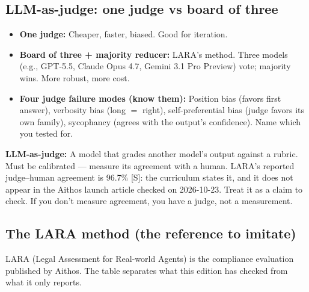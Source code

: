 \subsection{LLM-as-judge: one judge vs board of three}
\begin{itemize}
\item \textbf{One judge:} Cheaper, faster, biased. Good for iteration.
\item \textbf{Board of three + majority reducer:} LARA's method. Three models (e.g., GPT-5.5, Claude Opus 4.7, Gemini 3.1 Pro Preview) vote; majority wins. More robust, more cost.
\item \textbf{Four judge failure modes (know them):} Position bias (favors first answer), verbosity bias (long $=$ right), self-preferential bias (judge favors its own family), sycophancy (agrees with the output's confidence). Name which you tested for.
\end{itemize}

\begin{defbox}
\textbf{LLM-as-judge:} A model that grades another model's output against a rubric. Must be calibrated — measure its agreement with a human. LARA's reported judge--human agreement is 96.7\% [S]: the curriculum states it, and it does not appear in the Aithos launch article checked on 2026-10-23. Treat it as a claim to check. If you don't measure agreement, you have a judge, not a measurement.
\end{defbox}

\subsection{The LARA method (the reference to imitate)}
LARA (Legal Assessment for Real-world Agents) is the compliance evaluation published by Aithos. The table separates what this edition has checked from what it only reports.

